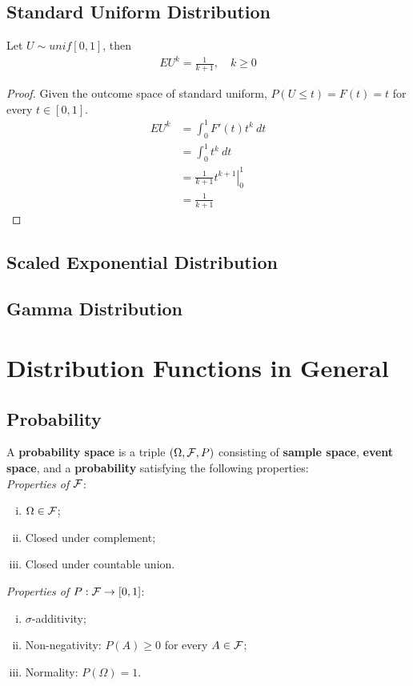 \documentclass{article}
\begin{document}
   	\subsection{Standard Uniform Distribution}
   	
   	\begin{theorem}
   		Let $U \sim unif[0, 1]$, then
   		\begin{align}
   			E U^{k}=\frac{1}{k+1}, \quad k \geq 0
   		\end{align}
   	\end{theorem}
   	
   	\begin{proof}
   	Given the outcome space of standard uniform, $P(U \leq t) = F(t) = t$ for every $t \in [0, 1]$.
   		\begin{align}
   			EU^k &= \int_0^1 F'(t) t^k\ dt \\
   			&= \int_0^1 t^k\ dt\\
   			&= \left. \frac{1}{k+1} t^{k+1} \right|_0^1 \\
   			&= \frac{1}{k+1}
   		\end{align}
   	\end{proof}
   	
   	\subsection{Scaled Exponential Distribution}
   	
   	\subsection{Gamma Distribution}
   	
   	\section{Distribution Functions in General}
   	\subsection{Probability}
   	\begin{definition}
   		A \textbf{probability space} is a triple $(\Omega, \mathcal{{F}}, P)$ consisting of \textbf{sample space}, \textbf{event space}, and a \textbf{probability} satisfying the following properties: \\
   		\emph{Properties of $\mathcal{{F}}$}:
   		\begin{enumerate}[(i)]
   			\item $\Omega \in \mathcal{{F}}$;
   			\item Closed under complement;
   			\item Closed under countable union.
   		\end{enumerate}
   		\emph{Properties of $P: \mathcal{{F}} \to [0, 1]$}: 
   		\begin{enumerate}[(i)]
   			\item $\sigma$-additivity;
   			\item Non-negativity: $P(A) \geq 0$ for every $A \in \mathcal{{F}}$;
   			\item Normality: $P(\Omega) = 1$.
   		\end{enumerate}
   	\end{definition}
   	
\end{document}
